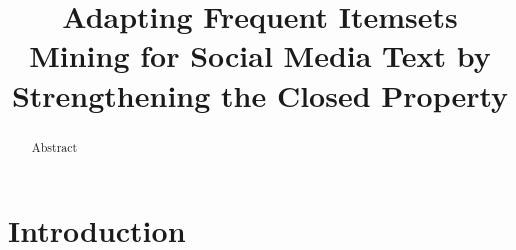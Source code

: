 \documentclass{sig-alternate}
\begin{document}
%

\title{Adapting Frequent Itemsets Mining for Social Media Text by Strengthening the Closed Property}

%
%
%
%
%
\maketitle
\begin{abstract}
Abstract
\end{abstract}

\section{Introduction}
\end{document}
